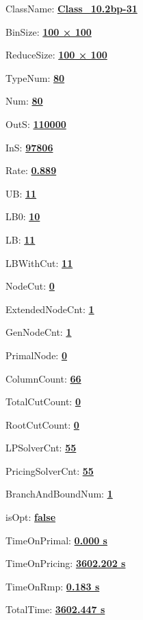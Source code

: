\documentclass[11pt]{article}
\begin{document}
\pagestyle{empty}


ClassName: \underline{\textbf{Class_10.2bp-31}}
\par
BinSize: \underline{\textbf{100 × 100}}
\par
ReduceSize: \underline{\textbf{100 × 100}}
\par
TypeNum: \underline{\textbf{80}}
\par
Num: \underline{\textbf{80}}
\par
OutS: \underline{\textbf{110000}}
\par
InS: \underline{\textbf{97806}}
\par
Rate: \underline{\textbf{0.889}}
\par
UB: \underline{\textbf{11}}
\par
LB0: \underline{\textbf{10}}
\par
LB: \underline{\textbf{11}}
\par
LBWithCut: \underline{\textbf{11}}
\par
NodeCut: \underline{\textbf{0}}
\par
ExtendedNodeCnt: \underline{\textbf{1}}
\par
GenNodeCnt: \underline{\textbf{1}}
\par
PrimalNode: \underline{\textbf{0}}
\par
ColumnCount: \underline{\textbf{66}}
\par
TotalCutCount: \underline{\textbf{0}}
\par
RootCutCount: \underline{\textbf{0}}
\par
LPSolverCnt: \underline{\textbf{55}}
\par
PricingSolverCnt: \underline{\textbf{55}}
\par
BranchAndBoundNum: \underline{\textbf{1}}
\par
isOpt: \underline{\textbf{false}}
\par
TimeOnPrimal: \underline{\textbf{0.000 s}}
\par
TimeOnPricing: \underline{\textbf{3602.202 s}}
\par
TimeOnRmp: \underline{\textbf{0.183 s}}
\par
TotalTime: \underline{\textbf{3602.447 s}}
\par
\newpage


\end{document}
